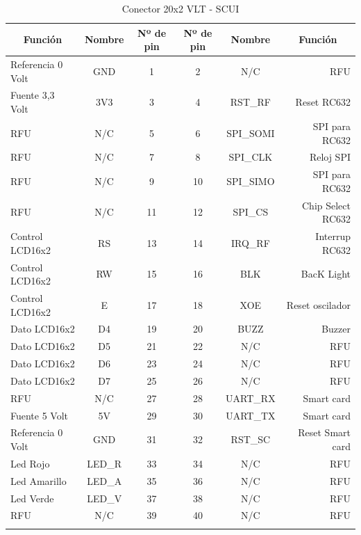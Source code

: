 \begin{longtable}{|l|c|c|c|c|r|}
\hline
\multicolumn{1}{|c|}{\textbf{Función}} & \textbf{Nombre} & \textbf{Nº de pin} & \textbf{Nº de pin} & \textbf{Nombre} & \multicolumn{1}{c|}{\textbf{Función}} \\ \hline
Referencia 0 Volt & GND & 1 & 2 & N/C & RFU \\ \hline
Fuente 3,3 Volt & 3V3 & 3 & 4 & RST\_RF & Reset RC632 \\ \hline
RFU & N/C & 5 & 6 & SPI\_SOMI & SPI para RC632 \\ \hline
RFU & N/C & 7 & 8 & SPI\_CLK & Reloj SPI \\ \hline
RFU & N/C & 9 & 10 & SPI\_SIMO & SPI para RC632 \\ \hline
RFU & N/C & 11 & 12 & SPI\_CS & Chip Select RC632 \\ \hline
Control LCD16x2 & RS & 13 & 14 & IRQ\_RF & Interrup RC632 \\ \hline
Control LCD16x2 & RW & 15 & 16 & BLK & BacK Light \\ \hline
Control LCD16x2 & E & 17 & 18 & XOE & Reset oscilador \\ \hline
Dato LCD16x2 & D4 & 19 & 20 & BUZZ & Buzzer \\ \hline
Dato LCD16x2 & D5 & 21 & 22 & N/C & RFU \\ \hline
Dato LCD16x2 & D6 & 23 & 24 & N/C & RFU \\ \hline
Dato LCD16x2 & D7 & 25 & 26 & N/C & RFU \\ \hline
RFU & N/C & 27 & 28 & UART\_RX & Smart card \\ \hline
Fuente 5 Volt & 5V & 29 & 30 & UART\_TX & Smart card \\ \hline
Referencia 0 Volt & GND & 31 & 32 & RST\_SC & Reset Smart card \\ \hline
Led Rojo & LED\_R & 33 & 34 & N/C & RFU \\ \hline
Led Amarillo & LED\_A & 35 & 36 & N/C & RFU \\ \hline
Led Verde & LED\_V & 37 & 38 & N/C & RFU \\ \hline
RFU & N/C & 39 & 40 & N/C & RFU \\ \hline
\caption{Conector 20x2 VLT - SCUI}\label{c_SCUI}
\end{longtable}


